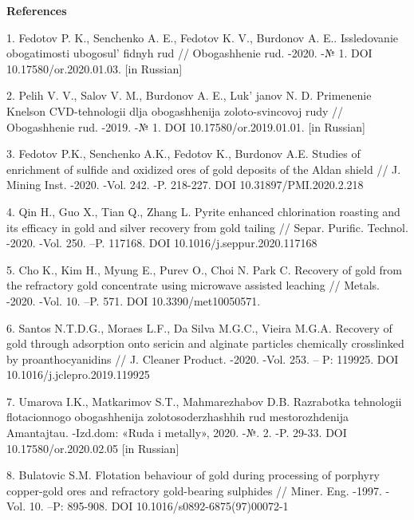 \begin{center}
{\bfseries References}
\end{center}

\begin{references}

1. Fedotov P. K., Senchenko A. E., Fedotov K. V., Burdonov A. E..
Issledovanie obogatimosti ubogosul' fidnyh rud //
Obogashhenie rud. -2020. -№ 1. DOI 10.17580/or.2020.01.03. {[}in
Russian{]}

2. Pelih V. V., Salov V. M., Burdonov A. E., Luk' janov
N. D. Primenenie Knelson CVD-tehnologii dlja obogashhenija
zoloto-svincovoj rudy // Obogashhenie rud. -2019. -№ 1. DOI
10.17580/or.2019.01.01. {[}in Russian{]}

3. Fedotov P.K., Senchenko A.K., Fedotov K., Burdonov A.E. Studies of
enrichment of sulfide and oxidized ores of gold deposits of the Aldan
shield // J. Mining Inst. -2020. -Vol. 242. -P. 218-227. \linebreak DOI
10.31897/PMI.2020.2.218

4. Qin H., Guo X., Tian Q., Zhang L. Pyrite enhanced chlorination
roasting and its efficacy in gold and silver recovery from gold tailing
// Separ. Purific. Technol. -2020. -Vol. 250. --P. 117168. \linebreak DOI
10.1016/j.seppur.2020.117168

5. Cho K., Kim H., Myung E., Purev O., Choi N. Park C. Recovery of gold
from the refractory gold concentrate using microwave assisted leaching
// Metals. -2020. -Vol. 10. --P. 571. \linebreak DOI 10.3390/met10050571.

6. Santos N.T.D.G., Moraes L.F., Da Silva M.G.C., Vieira M.G.A. Recovery
of gold through adsorption onto sericin and alginate particles
chemically crosslinked by proanthocyanidins // J. Cleaner Product.
-2020. -Vol. 253. -- P: 119925. DOI 10.1016/j.jclepro.2019.119925

7. Umarova I.K., Matkarimov S.T., Mahmarezhabov D.B. Razrabotka
tehnologii flotacionnogo \linebreak obogashhenija zolotosoderzhashhih rud
mestorozhdenija Amantajtau. -Izd.dom: «Ruda i metally», 2020. -№. 2. -P.
29-33. DOI 10.17580/or.2020.02.05 {[}in Russian{]}

8. Bulatovic S.M. Flotation behaviour of gold during processing of
porphyry copper-gold ores and refractory gold-bearing sulphides //
Miner. Eng. -1997. -Vol. 10. --P: 895-908. DOI
10.1016/s0892-6875(97)00072-1
\end{references}

